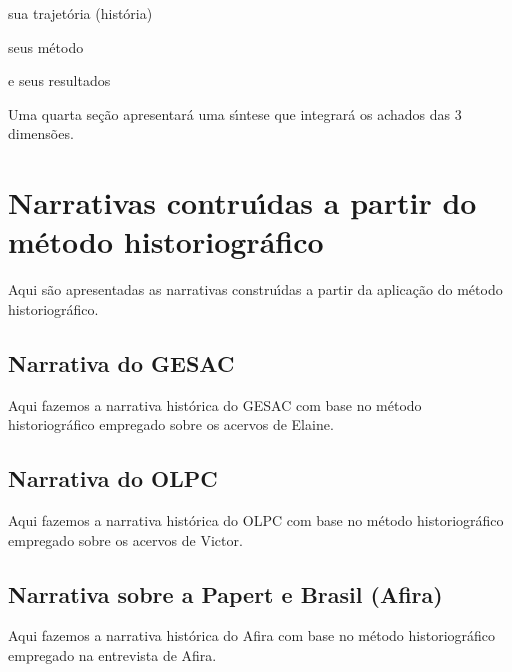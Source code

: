\documentclass[
12pt,		%
openright,	%
twoside,  %
a4paper,			%
chapter=TITLE,		%
english,			%
french,				%
spanish,			%
brazil				%
]{USPSC-classe/USPSC_RedarTex}
\begin{document}
\begin{alineas}
\item sua trajet\'oria (hist\'oria)
\item seus m\'etodo
\item e seus resultados
\end{alineas}

Uma quarta se\c{c}\~ao apresentar\'a uma s\'{\i}ntese que integrar\'a os achados das 3 dimens\~oes.








\section[Narrativas contru\'{\i}das a partir do m\'etodo historiogr\'afico]{Narrativas contru\'{\i}das a partir do m\'etodo historiogr\'afico}\label{Narrativas contru\'{\i}das a partir do m\'etodo historiogr\'afico}
Aqui s\~ao apresentadas as narrativas constru\'{\i}das a partir da aplica\c{c}\~ao do m\'etodo historiogr\'afico.








\subsection[Narrativa do GESAC]{Narrativa do GESAC}\label{Narrativa do GESAC}
Aqui fazemos a narrativa hist\'orica do GESAC com base no m\'etodo historiogr\'afico empregado sobre os acervos de Elaine.








\subsection[Narrativa do OLPC]{Narrativa do OLPC}\label{Narrativa do OLPC}
Aqui fazemos a narrativa hist\'orica do OLPC com base no m\'etodo historiogr\'afico empregado sobre os acervos de Victor.








\subsection[Narrativa sobre a Papert e Brasil (Afira)]{Narrativa sobre a Papert e Brasil (Afira)}\label{Narrativa sobre a Papert e Brasil (Afira)}
Aqui fazemos a narrativa hist\'orica do Afira com base no m\'etodo historiogr\'afico empregado na entrevista de Afira.
\end{document}
